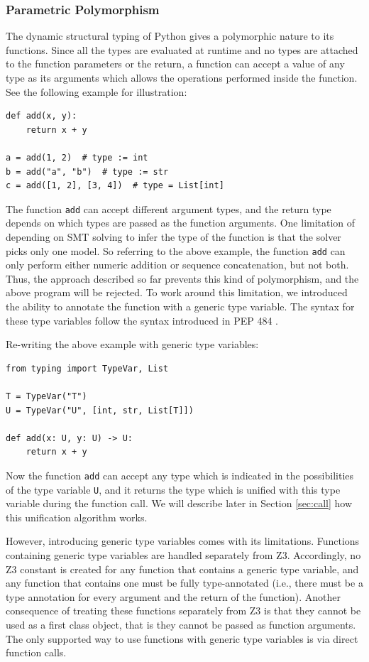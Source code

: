 \subsubsection{Parametric Polymorphism}
The dynamic structural typing of Python gives a polymorphic nature to its functions. Since all the types are evaluated at runtime and no types are attached to the function parameters or the return, a function can accept a value of any type as its arguments which allows the operations performed inside the function. See the following example for illustration:
\begin{lstlisting}
def add(x, y):
	return x + y
	
a = add(1, 2)  # type := int
b = add("a", "b")  # type := str
c = add([1, 2], [3, 4])  # type = List[int]
\end{lstlisting}
The function \lstinline|add| can accept different argument types, and the return type depends on which types are passed as the function arguments. One limitation of depending on SMT solving to infer the type of the function is that the solver picks only one model. So referring to the above example, the function \lstinline|add| can only perform either numeric addition or sequence concatenation, but not both. Thus, the approach described so far prevents this kind of polymorphism, and the above program will be rejected. To work around this limitation, we introduced the ability to annotate the function with a generic type variable. The syntax for these type variables follow the syntax introduced in PEP 484 \cite{484}.

Re-writing the above example with generic type variables:

\begin{lstlisting}
from typing import TypeVar, List

T = TypeVar("T")
U = TypeVar("U", [int, str, List[T]])

def add(x: U, y: U) -> U:
	return x + y
\end{lstlisting}
Now the function \lstinline|add| can accept any type which is indicated in the possibilities of the type variable \lstinline|U|, and it returns the type which is unified with this type variable during the function call. We will describe later in Section \ref{sec:call} how this unification algorithm works.

However, introducing generic type variables comes with its limitations. Functions containing generic type variables are handled separately from Z3. Accordingly, no Z3 constant is created for any function that contains a generic type variable, and any function that contains one must be fully type-annotated (i.e., there must be a type annotation for every argument and the return of the function). Another consequence of treating these functions separately from Z3 is that they cannot be used as a first class object, that is they cannot be passed as function arguments. The only supported way to use functions with generic type variables is via direct function calls.
